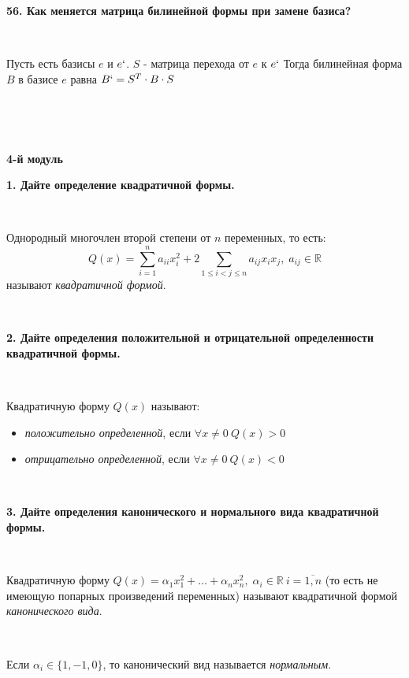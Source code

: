 \documentclass{article}
\begin{document}
    \textbf{56. Как меняется матрица билинейной формы при замене базиса?}

    {
        $\;$
        \setlength{\parindent}{0.4cm}
        \hangindent=0.4cm

    Пусть есть базисы $e$ и $e`$. $S$ - матрица перехода от $e$ к $e`$ Тогда билинейная форма $B$ в базисе $e$ равна $B` = S^{T} \cdot B \cdot S$

        $\;$
        \setlength{\parindent}{0cm}
        \hangindent=0cm
    }

    \newpage

    \Large
    \centering

    $\;$

    \textbf{4-й модуль}

    \flushleft
    \small

    \textbf{1. Дайте определение квадратичной формы.}

    {
        $\;$
        \setlength{\parindent}{0.4cm}
        \hangindent=0.4cm

    Однородный многочлен второй степени от $n$ переменных, то есть: $$Q(x)=\sum\limits_{i=1}^n a_{ii}x_i^2+2\sum\limits_{1\leq i<j\leq n} a_{ij}x_ix_j,\; a_{ij}\in\mathbb{R}$$называют \textit{квадратичной формой}.

        $\;$
        \setlength{\parindent}{0cm}
        \hangindent=0cm
    }

    \textbf{2. Дайте определения положительной и отрицательной определенности квадратичной формы.}

    {
        $\;$
        \setlength{\parindent}{0.4cm}
        \hangindent=0.4cm

    Квадратичную форму $Q(x)$ называют:

        \begin{itemize}
            \item \textit{положительно определенной}, если $\forall x\ne 0\ Q(x)>0$
            \item \textit{отрицательно определенной}, если $\forall x\ne 0\ Q(x)<0$\\
        \end{itemize}

        $\;$
        \setlength{\parindent}{0cm}
        \hangindent=0cm
    }



    \textbf{3. Дайте определения канонического и нормального вида квадратичной формы.}

    {
        $\;$
        \setlength{\parindent}{0.4cm}
        \hangindent=0.4cm

    Квадратичную форму $Q(x)=\alpha_1x_1^2+\ldots+\alpha_nx_n^2, \; \alpha_i\in\mathbb{R}\ i=\overline{1, n}$ (то есть не имеющую попарных произведений переменных) называют квадратичной формой \textit{канонического вида}.

        $\;$

        Если $\alpha_i\in\{1, -1, 0\}$, то канонический вид называется \textit{нормальным}.

        $\;$
        \setlength{\parindent}{0cm}
        \hangindent=0cm
    }
\end{document}
